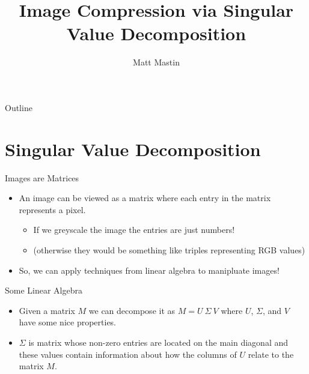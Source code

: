 \documentclass{beamer}
\title[SVD Image Compression] %
{Image Compression via Singular Value Decomposition}
\author[Matt Mastin]%
{Matt Mastin\inst{}}
\institute[Universities of Somewhere and Elsewhere] %
{
  \inst{}%
  Data Software Engineer\\
  MailChimp
  }
\begin{document}
\begin{frame}
  \titlepage
\end{frame}

\begin{frame}{Outline}
  \tableofcontents
\end{frame}







\section{Singular Value Decomposition}

\begin{frame}{Images are Matrices}
\begin{itemize}

\item An image can be viewed as a matrix where each entry in the matrix represents a pixel.

	\begin{itemize}
	\item If we greyscale the image the entries are just numbers!
	\item (otherwise they would be something like triples representing RGB values)
	\end{itemize}

\item So, we can apply techniques from linear algebra to manipluate images!

\end{itemize}  
\end{frame}

\begin{frame}{Some Linear Algebra}
\begin{itemize}

\item Given a matrix $M$ we can decompose it as $M = U~\Sigma~V$ where $U$, $\Sigma$, and $V$ have some nice properties.

\item $\Sigma$ is matrix whose non-zero entries are located on the main diagonal and these values contain information about how the columns of $U$ relate to the matrix $M$.

\end{itemize}  
\end{frame}
\end{document}
